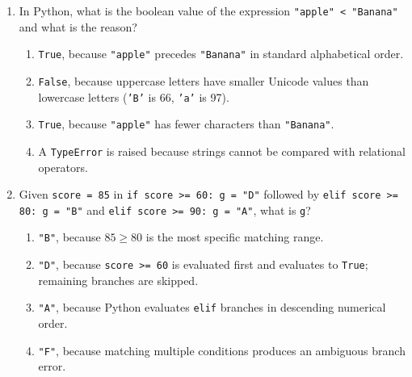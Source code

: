 \documentclass[11pt,a4paper]{article}
\begin{document}
\begin{enumerate}[label=\textbf{Q\arabic*.},leftmargin=2em,itemsep=1.5pt,topsep=1pt]
\item In Python, what is the boolean value of the expression \texttt{"apple" < "Banana"} and what is the reason?
\begin{enumerate}[label=\Alph*.,leftmargin=2em]
  \item \texttt{True}, because \texttt{"apple"} precedes \texttt{"Banana"} in standard alphabetical order.
  \item \texttt{False}, because uppercase letters have smaller Unicode values than lowercase letters (\texttt{'B'} is 66, \texttt{'a'} is 97).
  \item \texttt{True}, because \texttt{"apple"} has fewer characters than \texttt{"Banana"}.
  \item A \texttt{TypeError} is raised because strings cannot be compared with relational operators.
\end{enumerate}

\item Given \texttt{score = 85} in \texttt{if score >= 60: g = "D"} followed by \texttt{elif score >= 80: g = "B"} and \texttt{elif score >= 90: g = "A"}, what is \texttt{g}?
\begin{enumerate}[label=\Alph*.,leftmargin=2em]
  \item \texttt{"B"}, because $85 \ge 80$ is the most specific matching range.
  \item \texttt{"D"}, because \texttt{score >= 60} is evaluated first and evaluates to \texttt{True}; remaining branches are skipped.
  \item \texttt{"A"}, because Python evaluates \texttt{elif} branches in descending numerical order.
  \item \texttt{"F"}, because matching multiple conditions produces an ambiguous branch error.
\end{enumerate}

\end{enumerate}

\newpage

\end{document}
